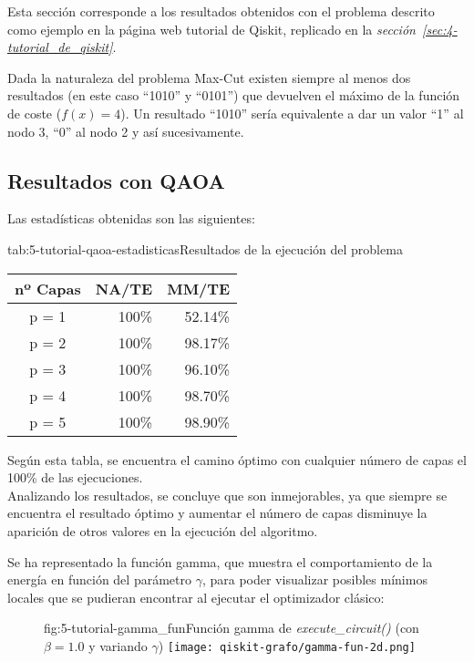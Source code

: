 Esta sección corresponde a los resultados obtenidos con el problema descrito como ejemplo en la página web tutorial de Qiskit\cite{qiskit_tutorial_antiguo}, replicado en la \textit{sección~\ref{sec:4-tutorial_de_qiskit}}.

Dada la naturaleza del problema Max-Cut existen siempre al menos dos resultados (en este caso ``1010'' y ``0101'') que devuelven el máximo de la función de coste ($f(x) = 4$).
Un resultado ``1010'' sería equivalente a dar un valor ``1'' al nodo 3, ``0'' al nodo 2 y así sucesivamente.

\subsection{Resultados con QAOA}

Las estadísticas obtenidas son las siguientes:

\begin{table}[Resultados QAOA {--} max-cut en grafo de 4 aristas]{tab:5-tutorial-qaoa-estadisticas}{Resultados de la ejecución del problema~\cite{qiskit_tutorial_antiguo}}
  \begin{tabular}{|c|r|r|}
    \hline
    \textbf{nº Capas} & \textbf{NA/TE} & \textbf{MM/TE} \\ \hline
    p = 1 & 100\% & 52.14\% \\ \hline
    p = 2 & 100\% & 98.17\% \\ \hline
    p = 3 & 100\% & 96.10\% \\ \hline
    p = 4 & 100\% & 98.70\% \\ \hline
    p = 5 & 100\% & 98.90\% \\ \hline
  \end{tabular}
\end{table}

Según esta tabla, se encuentra el camino óptimo con cualquier número de capas el 100\% de las ejecuciones.
\\
Analizando los resultados, se concluye que son inmejorables, ya que siempre se encuentra el resultado óptimo y aumentar el número de capas disminuye la aparición de otros valores en la ejecución del algoritmo.

Se ha representado la función gamma, que muestra el comportamiento de la energía en función del parámetro $\gamma$, para poder visualizar posibles mínimos locales que se pudieran encontrar al ejecutar el optimizador clásico:

\begin{figure}[Función gamma {--} max-cut en grafo de 4 aristas]{fig:5-tutorial-gamma_fun}{Función gamma de \textit{execute\_circuit()} (con $\beta = 1.0$ y variando $\gamma$)}
  \texttt{[image: qiskit-grafo/gamma-fun-2d.png]}
\end{figure}

